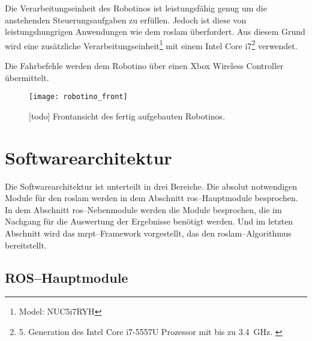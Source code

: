 Die Verarbeitungseinheit des Robotinos ist leistungsfähig genug um die anstehenden Steuerungsaufgaben zu erfüllen. Jedoch ist diese von leistungshungrigen Anwendungen wie dem \Gls{roslam} überfordert. Aus diesem Grund wird eine zusätzliche Verarbeitungseinheit\footnote{Model: NUC5i7RYH} mit einem Intel Core i7\footnote{5. Generation des Intel Core i7-5557U Prozessor mit bis zu \SI{3.4}{\GHz}. \cite{intel2015nucproductbrief}} verwendet.

Die Fahrbefehle werden dem Robotino über einen Xbox Wireless Controller übermittelt.

\begin{figure}[h]
	\centering
	\texttt{[image: robotino\_front]}
	\caption{[todo] Frontansicht des fertig aufgebauten Robotinos.}
	\label{fig:robotino_front}
\end{figure}


\begin{comment}
--------------------------------------------------------------------------------
- Kurzbeschreibung der Modulfunktion
- Welche Funktion erfüllt dieses Modul
- Welche ROS-Messages/-Topics/-Services bietet dieses Modul
\end{comment}
\section{Softwarearchitektur}

Die Softwarearchitektur ist unterteilt in drei Bereiche. Die absolut notwendigen Module für den \Gls{roslam} werden in dem Abschnitt \Gls{ros}--Hauptmodule besprochen. In dem Abschnitt \Gls{ros}--Nebenmodule werden die Module besprochen, die im Nachgang für die Auswertung der Ergebnisse benötigt werden. Und im letzten Abschnitt wird das \Gls{mrpt}--Framework vorgestellt, das den \Gls{roslam}--Algorithmus bereitstellt.


\begin{comment}
--------------------------------------------------------------------------------
- todo: Übersicht über alle Module und deren Verbindung zu einander?
\end{comment}
\subsection{ROS--Hauptmodule}


\begin{comment}
--------------------------------------------------------------------------------
- \url{http://wiki.ros.org/robotino_node}
- todo: Service reset_odometry
\end{comment}
